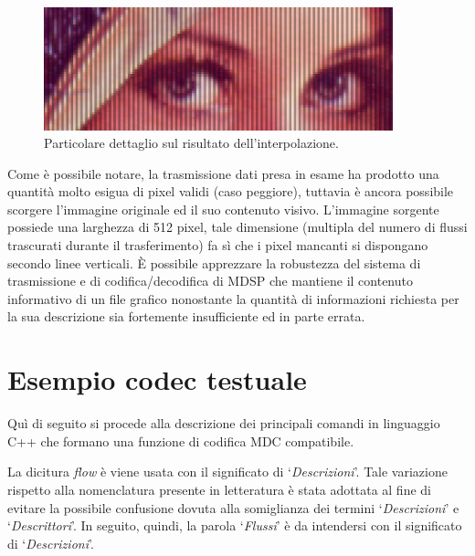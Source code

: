 \begin{figure}[ht]
\includegraphics[width=0.90\textwidth]{../images/occhi.png}
\centering \caption{Particolare dettaglio sul risultato dell'interpolazione.}
	\label{fig:occhi}
\end{figure}
Come è possibile notare, la trasmissione dati presa in esame ha prodotto una
quantità molto esigua di pixel validi (caso peggiore), tuttavia è ancora
possibile scorgere l'immagine originale ed il suo contenuto visivo. L'immagine sorgente possiede
una larghezza di 512 pixel, tale dimensione (multipla del numero di flussi
trascurati durante il trasferimento) fa sì che i pixel mancanti si dispongano
secondo linee verticali. \`E possibile apprezzare la robustezza del
sistema di trasmissione e di codifica/decodifica di MDSP che mantiene il contenuto informativo di un file
grafico nonostante la quantità di informazioni richiesta per la sua descrizione
sia fortemente insufficiente ed in parte errata.


\section{Esempio codec testuale}
\label{sec:esempio_codec}
Quì di seguito si procede alla descrizione dei principali comandi in linguaggio
C++ che formano una funzione di codifica MDC compatibile.

\begin{notabene}
La dicitura \textit{flow} è viene usata con il significato di
`\emph{Descrizioni}'. Tale variazione rispetto alla nomenclatura presente in
letteratura è stata adottata al fine di evitare la possibile confusione dovuta
alla somiglianza dei termini `\emph{Descrizioni}' e `\emph{Descrittori}'. In seguito, quindi, la parola `\emph{Flussi}' è da intendersi con il significato di `\emph{Descrizioni}'.
\end{notabene}

